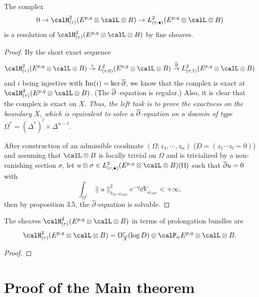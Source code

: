\documentclass[lang=en,12pt]{beautybook}
\begin{document}
\begin{proposition}
  The complex \begin{align*}
    0\to\calH^2_{(r)}(E^{p,q}\otimes\calL\otimes B)\to L^2_{(r,\bullet)}(E^{p,q}\otimes\calL\otimes B)
  \end{align*}
  is a resolution of $\calH^2_{(r)}(E^{p,q}\otimes\calL\otimes B)$ by fine sheaves.
\end{proposition}
\begin{proof}
  By the short exact sequence \begin{align*}
    \calH^2_{(r)}(E^{p,q}\otimes\calL\otimes B) \stackrel{i}{\rightarrow} L^2_{(r,0)}(E^{p,q}\otimes\calL\otimes B)\stackrel{\bdd}{\rightarrow} L^2_{(r,1)}(E^{p,q}\otimes\calL\otimes B)
  \end{align*} and $i$ being injective with $\operatorname{Im}(i)=\ker \overline{\partial}$, we know that the complex is exact at $\calH^2_{(r)}(E^{p,q}\otimes\calL\otimes B)$. (The $\overline{\partial}$--equation is regular.) Also, it is clear that the complex is exact on $X$. \emph{Thus, the left task is to prove the exactness on the boundary $\overline{X}$, which is equivalent to solve a $\overline{\partial}$-equation on a doamin of type $\Omega^*=(\Delta^*)^l\times \Delta^{n-l}$.}

  After construction of an admissible coodinate $(\Omega;z_1,\cdots,z_n)$ ($D=(z_1\cdots z_l=0)$) and assuming that $\calL\otimes B$ is locally trivial on $\Omega$ and is trivialized by a non-vanishing section $\sigma$, let $u\otimes \sigma\in L^2_{(r,\bullet)}(E^{p,q}\otimes\calL\otimes B)(\Omega)$ such that $\overline{\partial} u=0$ with
  \[
    \int_{\Omega^*}\| u\|^2_{h_E,\omega_{\text{car\'e}}}e^{-\eta}\dd V_{\omega_{\text{car\'e}}}<+\infty,
  \]
  then by proposition 3.5, the $\overline{\partial}$-equation is solvable.
\end{proof}

\begin{proposition}
  The sheaves $\calH^2_{(r)}(E^{p,q}\otimes\calL\otimes B)$ in terms of prolongation bundles are \[\calH^2_{(r)}(E^{p,q}\otimes\calL\otimes B)=\Omega^r_{\overline{X}}(\log D)\otimes \calP_\alpha E^{p,q}\otimes\calL\otimes B.\]
\end{proposition}
\begin{proof}

\end{proof}

\section{Proof of the Main theorem}
\end{document}
